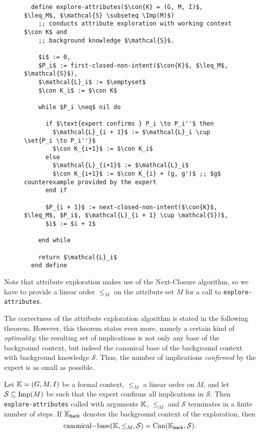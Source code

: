 \begin{figure}[tp]
  \begin{Algorithm}
    \label{alg:attribute-exploration}
    \hspace*{0cm}
\begin{lstlisting}
  define explore-attributes($\con{K} = (G, M, I)$, $\leq_M$, $\mathcal{S} \subseteq \Imp(M)$)
    ;; conducts attribute exploration with working context $\con K$ and
    ;; background knowledge $\mathcal{S}$.

    $i$ := 0,
    $P_i$ := first-closed-non-intent($\con{K}$, $\leq_M$, $\mathcal{S}$),
    $\mathcal{L}_i$ := $\emptyset$
    $\con K_i$ := $\con K$

    while $P_i \neq$ nil do

      if $\text{expert confirms } P_i \to P_i''$ then
        $\mathcal{L}_{i + 1}$ := $\mathcal{L}_i \cup \set{P_i \to P_i''}$
        $\con K_{i+1}$ := $\con K_i$
      else
        $\mathcal{L}_{i+1}$ := $\mathcal{L}_i$
        $\con K_{i+1}$ := $\con K_{i} + (g, g')$ ;; $g$ counterexample provided by the expert
      end if

      $P_{i + 1}$ := next-closed-non-intent($\con{K}$, $\leq_M$, $P_i$, $\mathcal{L}_{i + 1} \cup \mathcal{S})$,
      $i$ := $i + 1$

    end while

    return $\mathcal{L}_i$
  end define
\end{lstlisting}
  \end{Algorithm}
\end{figure}

Note that attribute exploration makes use of the Next-Closure algorithm, so we have to
provide a linear order $\leq_M$ on the attribute set $M$ for a call to
\lstinline{explore-attributes}.

The correctness of the attribute exploration algorithm is stated in the following theorem.
However, this theorem states even more, namely a certain kind of \emph{optimality}: the
resulting set of implications is not only any base of the background context, but indeed
the canonical base of the background context with background knowledge $\mathcal{S}$.
Thus, the number of implications \emph{confirmed} by the expert is as small as possible.

\begin{Theorem}
  \label{thm:attribute-exploration}
  Let ${\mathbb{K}} = (G, M, I)$ be a formal context, $\leq_M$ a linear order on $M$, and let
  $\mathcal{S} \subseteq \operatorname{Imp}(M)$ be such that the expert confirms all implications in
  $\mathcal{S}$.  Then \lstinline{explore-attributes} called with arguments ${\mathbb{K}}$,
  $\leq_M$ and $\mathcal{S}$ terminates in a finite number of steps.  If ${\mathbb{K}}_{\mathsf{back}}$ denotes the background context of the exploration, then
  \begin{equation*}
    \text{\lstinline{canonical-base}}(\con K, \leq_M, \mathcal{S}) = \Can(\con
    K_{\mathsf{back}}, \mathcal{S}).
  \end{equation*}
\end{Theorem}

